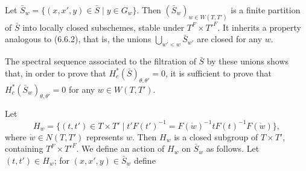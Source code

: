 \documentclass[9pt,twoside]{extarticle}
\begin{document}
{Let \(\bar S_w=\{(x,x',y)\in\bar S\mid y\in G_w\}\). Then \((\bar S_w)_{w\in W(T,T')}\) is a finite partition of \(\bar S\) into locally closed subschemes, stable under \(T^F\times T'^F\). It inherits a property analogous to (6.6.2), that is, the unions \(\bigcup_{w'<w}\bar S_{w'}\) are closed for any \(w\).\par

The spectral sequence associated to the filtration of \(\bar S\) by these unions shows that, in order to prove that \(H_c^*(\bar S)_{\theta,\theta'}=0\), it is sufficient to prove that \(H_c^*(\bar S_w)_{\theta,\theta'}=0\) for any \(w\in W(T,T')\).\par

Let \[
H_w=\{(t,t')\in T\times T'\mid t'F(t')^{-1}=F(\dot w)^{-1}tF(t)^{-1}F(\dot w)\},
\] where \(\dot w\in N(T,T')\) represents \(w\). Then \(H_w\) is a closed subgroup of \(T\times T'\), containing \(T^F\times T'^F\). We define an action of \(H_w\) on \(\bar S_w\) as follows. Let \((t,t')\in H_w\); for \((x,x',y)\in\bar S_w\) define\par
}
\end{document}
